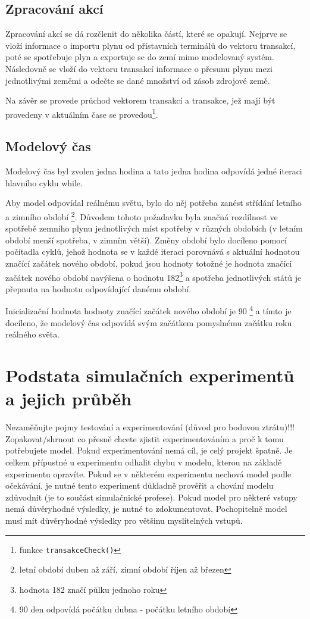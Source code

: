 \documentclass[a4paper,11pt]{article}
\begin{document}
\subsection{Zpracování akcí}

Zpracování akcí se dá rozčlenit do několika částí, které se opakují.
Nejprve se vloží informace o importu plynu od přístavních terminálů do vektoru transakcí,
poté se spotřebuje plyn a exportuje se do zemí mimo modelovaný systém.
Následovně se vloží do vektoru transakcí informace o přesunu plynu mezi jednotlivými zeměmi
a odečte se dané množství od zásob zdrojové země.

Na závěr se provede průchod vektorem transakcí a transakce,
jež mají být provedeny v aktuálním čase se provedou\footnote{funkce \texttt{transakceCheck()}}. 

\subsection{Modelový čas}

Modelový čas byl zvolen jedna hodina a tato jedna hodina odpovídá jedné iteraci hlavního cyklu while.

Aby model odpovídal reálnému světu, bylo do něj potřeba zanést střídání letního a zimního období
\footnote{letní období duben až září, zimní období říjen až březen}.
Důvodem tohoto požadavku byla značná rozdílnost ve spotřebě zemního plynu jednotlivých míst spotřeby
v různých obdobích (v letním období menší spotřeba, v zimním větší).
Změny období bylo docíleno pomocí počítadla cyklů, jehož hodnota se v každé iteraci porovnává 
s aktuální hodnotou značící začátek nového období, pokud jsou hodnoty totožné 
je hodnota značící začátek nového období navýšena o hodnotu 182\footnote{hodnota 182 značí půlku jednoho roku}
a spotřeba jednotlivých států je přepnuta na hodnotu odpovídající danému období.

Inicializační hodnota hodnoty značící začátek nového období je 90 \footnote{90 den odpovídá počátku dubna - počátku letního období}
a tímto je docíleno, že modelový čas odpovídá svým začátkem pomyslnému začátku roku reálného světa.

\section{Podstata simulačních experimentů a jejich průběh}

Nezaměňujte pojmy testování a experimentování (důvod pro bodovou ztrátu)!!!
Zopakovat/shrnout co přesně chcete zjistit experimentováním a proč k tomu potřebujete model. Pokud experimentování nemá cíl, je celý projekt špatně. Je celkem přípustné u experimentu odhalit chybu v modelu, kterou na základě experimentu opravíte. Pokud se v některém experimentu nechová model podle očekávání, je nutné tento experiment důkladně prověřit a chování modelu zdůvodnit (je to součást simulačnické profese). Pokud model pro některé vstupy nemá důvěryhodné výsledky, je nutné to zdokumentovat. Pochopitelně model musí mít důvěryhodné výsledky pro většinu myslitelných vstupů.
\end{document}
